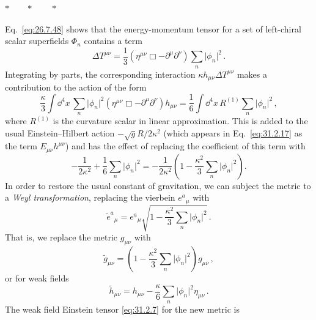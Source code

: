 \begin{center}
\(\ast\qquad\ast\qquad\ast\)
\end{center}

Eq.~\eqref{eq:26.7.48} shows that the energy-momentum tensor for a set of
left-chiral scalar superfields \(\Phi_n\) contains a term
\begin{equation}
  \Delta T^{\mu\nu}
  =\frac13
   \left(\eta^{\mu\nu}\Box-\partial^\mu\partial^\nu\right)
   \sum_n\lvert\phi_n\rvert^2\,.
  \tag{31.2.26}\label{eq:31.2.26}
\end{equation}
Integrating by parts, the corresponding interaction
\(\kappa h_{\mu\nu}\Delta T^{\mu\nu}\) makes a contribution to the action of
the form
\begin{equation}
  \frac{\kappa}{3}\int \dd^4x\,
  \sum_n\lvert\phi_n\rvert^2
  \left(\eta^{\mu\nu}\Box-\partial^\mu\partial^\nu\right)h_{\mu\nu}
  =\frac16\int \dd^4x\,R^{(1)}\sum_n\lvert\phi_n\rvert^2\,,
  \tag{31.2.27}\label{eq:31.2.27}
\end{equation}
where \(R^{(1)}\) is the curvature scalar in linear approximation. This is
added to the usual Einstein--Hilbert action
\(-\sqrt{g}R/2\kappa^2\) (which appears in Eq.~\eqref{eq:31.2.17} as the term
\(E_{\mu\nu}h^{\mu\nu}\)) and has the effect of replacing the coefficient of
this term with
\begin{equation}
  -\frac{1}{2\kappa^2}
  +\frac16\sum_n\lvert\phi_n\rvert^2
  =-\frac{1}{2\kappa^2}
   \left(1-\frac{\kappa^2}{3}\sum_n\lvert\phi_n\rvert^2\right).
  \tag{31.2.28}\label{eq:31.2.28}
\end{equation}
In order to restore the usual constant of gravitation, we can subject the
metric to a \emph{Weyl transformation}, replacing the vierbein \(e^a{}_\mu\)
with
\begin{equation}
  \widetilde e^a{}_\mu
  =e^a{}_\mu
   \sqrt{1-\frac{\kappa^2}{3}\sum_n\lvert\phi_n\rvert^2}\,.
  \tag{31.2.29}\label{eq:31.2.29}
\end{equation}
That is, we replace the metric \(g_{\mu\nu}\) with
\begin{equation}
  \widetilde g_{\mu\nu}
  =\left(1-\frac{\kappa^2}{3}\sum_n\lvert\phi_n\rvert^2\right)g_{\mu\nu}\,,
  \tag{31.2.30}\label{eq:31.2.30}
\end{equation}
or for weak fields
\begin{equation}
  \widetilde h_{\mu\nu}
  =h_{\mu\nu}
   -\frac{\kappa}{6}\sum_n\lvert\phi_n\rvert^2\eta_{\mu\nu}\,.
  \tag{31.2.31}\label{eq:31.2.31}
\end{equation}
The weak field Einstein tensor \eqref{eq:31.2.7} for the new metric is

